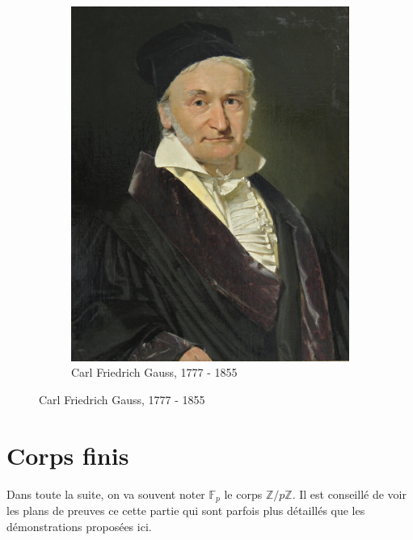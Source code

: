 \documentclass[5pt,a4paper]{article}
\newcounter{prop}[section]
\begin{document}
\begin{onehalfspacing}
\begin{figure}[h]
\begin{subfigure}{0.4\textwidth}
        \includegraphics[height=0.152\textheight]{ressources/gauss.jpg}
        \caption{Carl Friedrich Gauss, 1777 - 1855}
    \end{subfigure}
\end{figure}


\newpage
\section{Corps finis}

Dans toute la suite, on va souvent noter $\mathbb{F}_{p}$ le corps $\mathbb{Z}/p\mathbb{Z}$. Il est conseillé de voir les plans de preuves ce cette partie qui sont parfois plus détaillés que les démonstrations proposées ici.\newline



\end{onehalfspacing}
\end{document}
